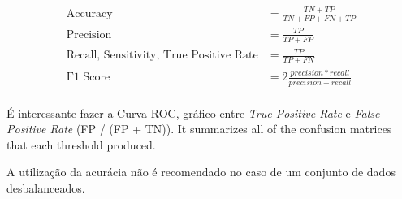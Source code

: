 \begin{align*}
\text{Accuracy} &= \frac{TN + TP}{TN + FP + FN + TP}\\
\text{Precision} &= \frac{TP}{TP + FP}\\
\text{Recall, Sensitivity, True Positive Rate} &= \frac{TP}{TP + FN}\\
\text{F1 Score} &= 2\frac{precision * recall}{precision + recall}\\
\end{align*}

É interessante fazer a Curva ROC, gráfico entre \textit{True Positive Rate} e \textit{False Positive Rate} (FP / (FP + TN)). It summarizes all of the confusion matrices that each threshold produced.

A utilização da acurácia não é recomendado no caso de um conjunto de dados desbalanceados.

